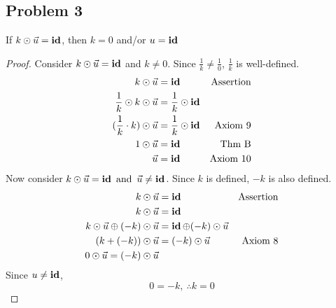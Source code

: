 \subsection*{Problem 3}
 If $k \odot \vec{u} = \operatorname{\textbf{id}}$, then $k=0$ and/or $u = \operatorname{\textbf{id}}$
\begin{proof}
  Consider $k \odot \vec{u} = \operatorname{\textbf{id}}$ and $k \neq 0 $. Since $\frac{1}{k} \neq \frac{1}{0}$, $\frac{1}{k}$ is well-defined.
  \begin{align*}
    k \odot \vec{u}                     & = \operatorname{\textbf{id}}                   & \text{Assertion} \\
    \frac{1}{k} \odot k \odot \vec{u}   & = \frac{1}{k} \odot \operatorname{\textbf{id}}                    \\
    (\frac{1}{k} \cdot k) \odot \vec{u} & = \frac{1}{k} \odot \operatorname{\textbf{id}} & \text{Axiom 9}   \\
    1 \odot \vec{u}                     & = \operatorname{\textbf{id}}                   & \text{Thm B}     \\
    \vec{u}                             & = \operatorname{\textbf{id}}                   & \text{Axiom 10}
  \end{align*}
  Now consider $k \odot \vec{u} = \operatorname{\textbf{id}} \operatorname{~\text{and}~} \vec{u} \neq \operatorname{\textbf{id}}$. Since $k$ is defined, $-k$ is also defined.
  \begin{align*}
    k \odot \vec{u}                           & = \operatorname{\textbf{id}}                           & \text{Assertion} \\
    k \odot \vec{u}                           & = \operatorname{\textbf{id}}                                              \\
    k \odot \vec{u} \oplus (-k) \odot \vec{u} & = \operatorname{\textbf{id}} \oplus (-k) \odot \vec{u}                    \\
    (k+ (-k)) \odot \vec{u}                   & = (-k) \odot \vec{u}            & \text{Axiom 8}   \\
    0 \odot \vec{u} = (-k) \odot \vec{u}
  \end{align*}
  Since $u \neq \operatorname{\textbf{id}}$,
  \[
    0 = -k,~\therefore k = 0
  \]
\end{proof}

